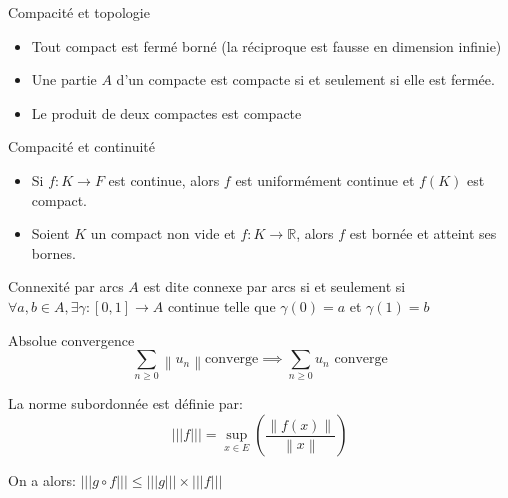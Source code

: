 \documentclass[french, a4paper, 11pt, twocolumn]{article}
\newcommand{\ssi}{si et seulement si\xspace}		%
\newcommand{\norme}[1]{\left\| #1\right\|}
\newcommand{\R}{\mathbb{R}}   %
\newcommand{\po}{\left(}         %
\newcommand{\pf}{\right)}        %
\newcommand{\pof}[1]{\po #1 \pf} %
\begin{document}
\begin{theoreme}{Compacité et topologie}
    \begin{itemize}[label=\(\bullet\)]
        \item Tout compact est fermé borné (la réciproque est fausse en dimension infinie)
        \item Une partie \(A\) d'un compacte est compacte \ssi elle est fermée.
        \item Le produit de deux compactes est compacte
    \end{itemize}
\end{theoreme}

\begin{theoreme}{Compacité et continuité}
    \begin{itemize}[label=\(\bullet\)]
        \item Si \(f : K \rightarrow F\) est continue, alors \(f\) est uniformément continue et \(f(K)\) est compact.
        \item Soient \(K\) un compact non vide et \(f : K \rightarrow \R\), alors \(f\) est bornée et atteint ses bornes.
    \end{itemize}
    
\end{theoreme}

\begin{theoreme}{Connexité par arcs}
    \(A\) est dite connexe par arcs \ssi \(\forall a,b \in A, \exists \gamma : [0,1] \rightarrow A\) continue telle que \(\gamma(0)=a\) et \(\gamma(1)=b\)
\end{theoreme}

\begin{theoreme}{Absolue convergence}
    \[\sum_{n \geq 0} \norme{u_n} \text{converge} \implies \sum_{n \geq 0} u_n \text{ converge}\]
\end{theoreme}

\begin{definition}
    La norme subordonnée est définie par:
    \[|||f|||=\underset{x \in E}{\sup}\pof{\dfrac{\norme{f(x)}}{\norme{x}}}\]

    On a alors: \(|||g \circ f||| \leq |||g||| \times |||f|||\)
\end{definition}
\end{document}
